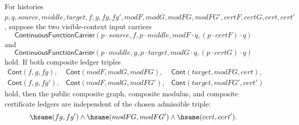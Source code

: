 \begin{theorem}
\label{thm:continuous-function-carrier-visible-modulus-context-composite-ledger-determinacy}
For histories $p,q,source,middle,target,f,g,fg,fg',modF,modG,modFG,modFG',
certF,certG,cert,cert'$, suppose the two visible-context input carriers
$$
\mathsf{ContinuousFunctionCarrier}(p\cdot source,f,p\cdot middle,
modF\cdot q,(p\cdot certF)\cdot q)
$$
and
$$
\mathsf{ContinuousFunctionCarrier}(p\cdot middle,g,p\cdot target,
modG\cdot q,(p\cdot certG)\cdot q)
$$
hold. If both composite ledger triples
$$
\begin{array}{lll}
\mathsf{Cont}(f,g,fg),&
\mathsf{Cont}(modF,modG,modFG),&
\mathsf{Cont}(target,modFG,cert),\\
\mathsf{Cont}(f,g,fg'),&
\mathsf{Cont}(modF,modG,modFG'),&
\mathsf{Cont}(target,modFG',cert')
\end{array}
$$
hold, then the public composite graph, composite modulus, and composite
certificate ledgers are independent of the chosen admissible triple:
$$
\hsame(fg,fg')\land\hsame(modFG,modFG')\land\hsame(cert,cert').
$$
\end{theorem}
